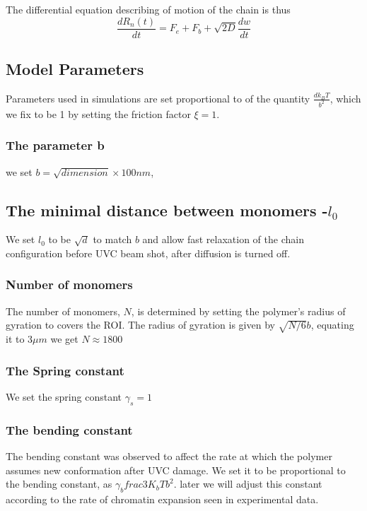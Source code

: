 \documentclass[12pt]{report}
\begin{document}
     The differential equation describing of motion of the chain is thus 
     \begin{equation*}
     \frac{dR_n(t)}{dt}= F_e +F_b +\sqrt{2D} \frac{dw}{dt}     
     \end{equation*}
     
    \subsection{Model Parameters}
      Parameters used in simulations are set proportional to of the quantity $\frac{dk_BT}{b^2}$, which we fix to be 1 by setting the friction factor $\xi=1$. 
    \subsubsection{The parameter b} 
      we set $b=\sqrt{dimension} \times 100 nm$, 
    \subsection{The minimal distance between monomers -$l_0$}
     We set $l_0$ to be $\sqrt{d}$ to match $b$ and allow fast relaxation of the chain configuration before UVC beam shot, after diffusion is turned off. 
    \subsubsection{Number of monomers}
      The number of monomers, $N$, is determined by setting the polymer's radius of gyration to covers the ROI. The radius of gyration is given by $\sqrt{N/6}b$, equating it to $3\mu m$ we get $N\approx 1800$                      
     \subsubsection{The Spring constant}
       We set the spring constant $\gamma_s =1$
     \subsubsection{The bending constant}       
       The bending constant was observed to affect the rate at which the polymer assumes new conformation after UVC damage.
       We set it to be proportional to the bending constant, as $\gamma_b frac{3K_bT}{b^2}$. later we will adjust this constant according to the rate of chromatin expansion seen in experimental data. 
       
\end{document}
